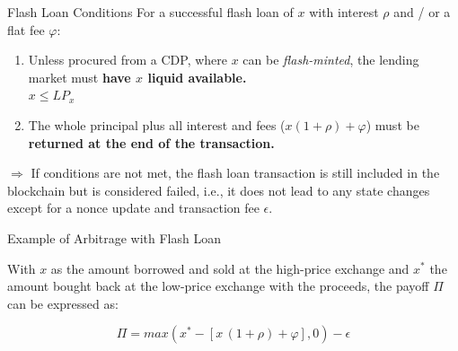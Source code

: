 \documentclass[handout]{beamer}
\begin{document}
\begin{frame}{Flash Loan Conditions}
For a successful flash loan of $x$ with interest $\rho$  and / or a flat fee $\varphi$:

\vspace{1em}
\begin{enumerate}

\item Unless procured from a CDP, where $x$ can be \textit{flash-minted}, the lending market must \textbf{have $x$ liquid available.}\\
$x \leq LP_{x}$

\item The whole principal plus all interest and fees ($ x(1+\rho) + \varphi$) must be \textbf{returned at the end of the transaction.}

\end{enumerate}

\vspace{1em}
$\Rightarrow$ If conditions are not met, the flash loan transaction is still included in the blockchain but is considered failed, i.e., it does not lead to any state changes except for a nonce update and transaction fee $\epsilon$. 


	
\end{frame}


\begin{frame}{Example of Arbitrage with Flash Loan}

With $x$ as the amount borrowed and sold at the high-price exchange and $x^\ast$ the amount bought back at the low-price exchange with the proceeds, the payoff $\Pi$ can be expressed as:

\begin{equation}
	\Pi = max (x^{\ast}-[x \,(1+\rho) + \varphi ],0) - \epsilon
\end{equation}

\vspace{0.5 em}

	
\end{frame}
\end{document}
